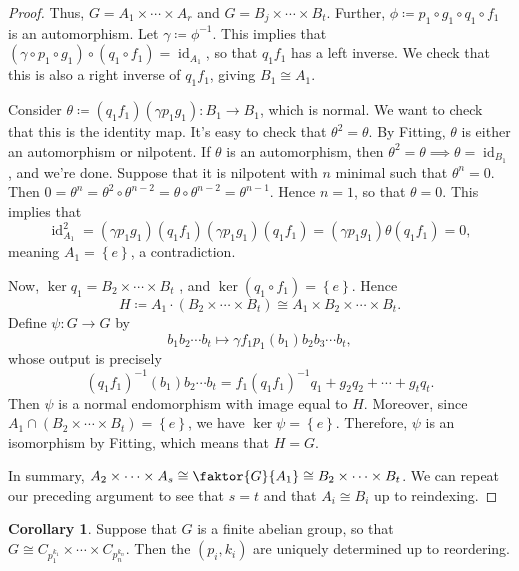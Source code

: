 \documentclass[10pt,letterpaper,cm]{nupset}
\theoremstyle{definition}
\theoremstyle{theorem}
\newtheorem{corollary}[definition]{Corollary}
\theoremstyle{remark}
\newcommand{\1}{\mathbf{1}}
\newcommand{\0}{\vec 0}
\DeclareMathOperator{\id}{\mathrm{id}}
\begin{document}
\begin{proof}
\medskip

 Thus, $G= A_1 \times \cdots \times A_r$ and $G= B_j \times \cdots \times B_t$. Further, $\phi\coloneqq p_1\circ g_1\circ q_1\circ f_1$ is an automorphism. Let $\gamma\coloneqq  \phi^{-1}$. This implies that $\left(\gamma \circ p_1 \circ g_1\right)\circ (q_1\circ f_1)=\id_{A_1}$, so that $q_1f_1$ has a left inverse. We check that this is also a right inverse of $q_1f_1$, giving $B_1 \cong A_1$.

\medskip

Consider $\theta \coloneqq  (q_1f_1)(\gamma p_1g_1) : B_1 \to B_1$, which is normal. We want to check that this is the identity map. It's easy to check that $ \theta^2 =  \theta.$
By Fitting, $\theta$ is either an automorphism or nilpotent. If $\theta$ is an automorphism, then $\theta^2 = \theta \implies \theta = \id_{B_1}$, and we're done. Suppose that it is nilpotent with $n$ minimal such that $\theta^n =0$. Then $0 = \theta^n = \theta^2 \circ \theta^{n-2} = \theta \circ \theta^{n-2}= \theta^{n-1}$. Hence $n=1$, so that $\theta =0$. This implies that $$\id_{A_1}^2 = \left(\gamma p_1 g_1\right)\left(q_1 f_1\right)\left(\gamma p_1 g_1\right)\left(q_1 f_1\right) = \left(\gamma p_1 g_1\right)\theta(q_1 f_1) = 0,$$ meaning $A_1= \left\{e\right\}$, a contradiction.

\medskip


Now, $\ker{q_1} = B_2 \times \cdots \times B_t$ , and $\ker(q_1 \circ f_1) = \left\{e\right\}$. Hence $$H\coloneqq  A_1 \cdot (B_2 \times \cdots \times B_t) \cong A_1 \times B_2 \times \cdots \times B_t.$$ Define $\psi : G\to G$ by $$b_1b_2\cdots b_t \mapsto \gamma f_1p_1(b_1)b_2b_3\cdots b_t,$$ whose output is precisely  $$\left(q_1f_1\right)^{-1}(b_1)b_2\cdots b_t= f_1(q_1f_1)^{-1}q_1 + g_2q_2+\cdots + g_tq_t .$$ Then $\psi$ is a normal endomorphism with image equal to $H$. Moreover, since $A_1\cap (B_2 \times \cdots \times B_t) =\left\{e\right\}$, we have $\ker{\psi} =\left\{e\right\}$. Therefore, $\psi$ is an isomorphism by Fitting, which means that $H=G$.

\medskip

 In summary, $A_2 \times \cdots \times A_s \cong \faktor{G}{A_1} \cong B_2\times \cdots \times B_t$. We can repeat our preceding argument to see that $s=t$ and that $A_i \cong B_i$ up to reindexing.
\end{proof}

\begin{corollary}
Suppose that $G$ is a finite abelian group, so that $G \cong C_{p_1^{k_1}} \times \cdots \times C_{p_n^{k_n}}$. Then the $\left(p_i, k_i\right)$ are uniquely determined up to reordering.
\end{corollary}
\end{document}
